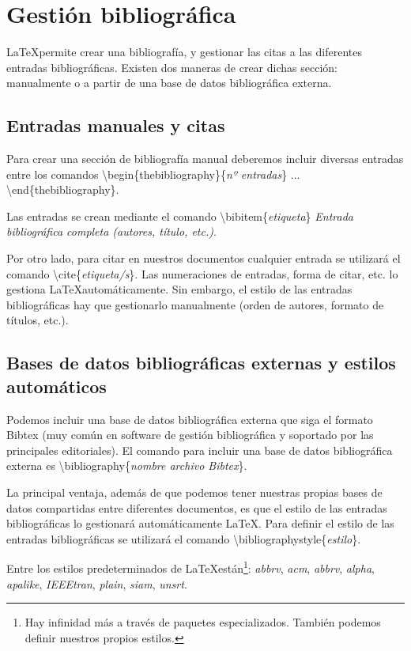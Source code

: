 \chapter{Gestión bibliográfica}

\LaTeX permite crear una bibliografía, y gestionar las citas a las diferentes entradas bibliográficas. Existen dos maneras de crear dichas sección: manualmente o a partir de una base de datos bibliográfica externa.

\section{Entradas manuales y citas}

Para crear una sección de bibliografía manual deberemos incluir diversas entradas entre los comandos \textbackslash begin\{thebibliography\}\{\emph{nº entradas}\} ... \textbackslash end\{thebibliography\}.

Las entradas se crean mediante el comando \textbackslash bibitem\{\emph{etiqueta}\} \emph{Entrada bibliográfica completa (autores, título, etc.)}.

Por otro lado, para citar en nuestros documentos cualquier entrada se utilizará el comando \textbackslash cite\{\emph{etiqueta/s}\}. Las numeraciones de entradas, forma de citar, etc. lo gestiona \LaTeX automáticamente. Sin embargo, el estilo de las entradas bibliográficas hay que gestionarlo manualmente (orden de autores, formato de títulos, etc.).

\section{Bases de datos bibliográficas externas y estilos automáticos}

Podemos incluir una base de datos bibliográfica externa que siga el formato Bibtex (muy común en software de gestión bibliográfica y soportado por las principales editoriales). El comando para incluir una base de datos bibliográfica externa es \textbackslash bibliography\{\emph{nombre archivo Bibtex}\}.

La principal ventaja, además de que podemos tener nuestras propias bases de datos compartidas entre diferentes documentos, es que el estilo de las entradas bibliográficas lo gestionará automáticamente \LaTeX. Para definir el estilo de las entradas bibliográficas se utilizará el comando \textbackslash bibliographystyle\{\emph{estilo}\}.

Entre los estilos predeterminados de \LaTeX están\footnote{Hay infinidad más a través de paquetes especializados. También podemos definir nuestros propios estilos.}: \emph{abbrv}, \emph{acm}, \emph{abbrv}, \emph{alpha}, \emph{apalike}, \emph{IEEEtran}, \emph{plain}, \emph{siam}, \emph{unsrt}.

